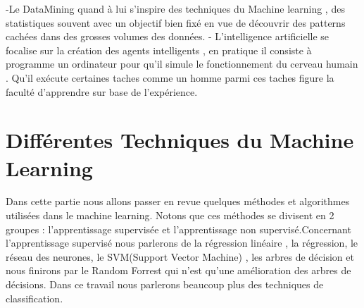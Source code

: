 -Le DataMining quand à lui s'inspire des techniques du Machine learning , des statistiques souvent avec un objectif bien fixé en vue de découvrir des patterns cachées dans des grosses volumes des données.
- L'intelligence artificielle se focalise sur la création des agents intelligents , en pratique il consiste à programme un ordinateur pour qu'il simule le fonctionnement du cerveau humain . Qu'il exécute certaines taches comme un homme parmi ces taches figure la faculté d'apprendre sur base de l'expérience.
\section{{ Différentes Techniques du Machine Learning   \cite{AndNgCourse}	} } 
Dans cette partie nous allons passer en revue quelques méthodes et algorithmes utilisées dans le machine learning.
Notons que ces méthodes se divisent en 2 groupes : l'apprentissage supervisée et l'apprentissage non supervisé.Concernant l'apprentissage supervisé nous parlerons de la régression linéaire , la régression, le réseau des neurones, le SVM(Support Vector Machine) , les arbres de décision et nous finirons par le Random Forrest qui n'est qu'une amélioration des arbres de décisions.
Dans ce travail nous parlerons beaucoup plus des techniques de classification.